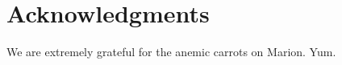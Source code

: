 \documentclass{ws-jai}
\begin{document}
	
\section*{Acknowledgments}

We are extremely grateful for the anemic carrots on Marion.  Yum.

                                                                                                                                                                                                   
{}


	
%
%












\end{document}
